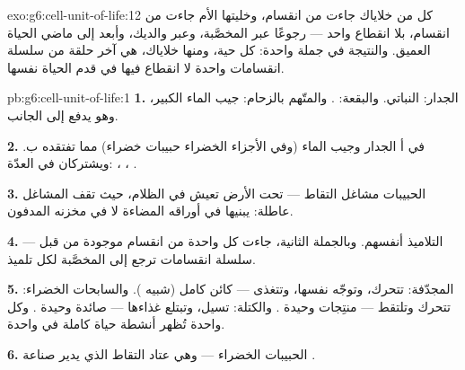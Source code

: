 \begin{solution}{exo:g6:cell-unit-of-life:12}
كل  من خلاياك جاءت من انقسام، وخليتها الأم جاءت من انقسام، بلا
انقطاع واحد --- رجوعًا عبر  المخصَّبة، وعبر  والديك،
وأبعد إلى ماضي الحياة العميق. والنتيجة في جملة واحدة: كل  حية،
ومنها خلاياك، هي آخر حلقة من سلسلة انقسامات واحدة لا انقطاع فيها
في قدم الحياة نفسها.
\end{solution}

\begin{solution}{pb:g6:cell-unit-of-life:1}
\textbf{1.} الجدار:  النباتي. والبقعة: .
والمتّهم بالزحام: جيب الماء الكبير، وهو يدفع  إلى الجانب.

\textbf{2.} في أ الجدار وجيب الماء (وفي الأجزاء الخضراء حبيبات
خضراء) مما تفتقده ب. ويشتركان في العدّة: ، ، .

\textbf{3.} الحبيبات مشاغل التقاط  ---  تحت الأرض
تعيش في الظلام، حيث تقف المشاغل عاطلة:  يبنيها في أوراقه
المضاءة لا في مخزنه المدفون.

\textbf{4.}  التلاميذ أنفسهم. وبالجملة الثانية، جاءت كل
واحدة من انقسام  موجودة من قبل --- سلسلة انقسامات ترجع إلى
 المخصَّبة لكل تلميذ.

\textbf{5.} المجدّفة: تتحرك، وتوجّه نفسها، وتتغذى --- كائن كامل
 (شبيه ). والسابحات الخضراء: تتحرك وتلتقط
 --- منتِجات وحيدة . والكتلة: تسيل، وتبتلع غذاءها ---
صائدة وحيدة . وكل واحدة تُظهر أنشطة حياة كاملة في 
واحدة.

\textbf{6.} الحبيبات الخضراء --- وهي عتاد التقاط  الذي يدير
صناعة .


\end{solution}

